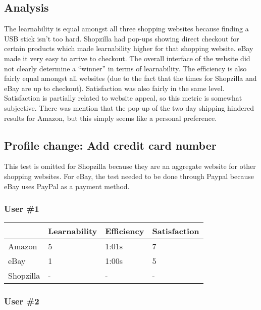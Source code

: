 \documentclass[11pt, oneside]{article}   	%
\begin{document}
\subsection{Analysis}

The learnability is equal amongst all three shopping websites because finding a USB stick isn't too hard. Shopzilla had pop-ups showing direct checkout for certain products which made learnability higher for that shopping website. eBay made it very easy to arrive to checkout. The overall interface of the website did not clearly determine a ``winner'' in terms of learnability. The efficiency is also fairly equal amongst all websites (due to the fact that the times for Shopzilla and eBay are up to checkout). Satisfaction was also fairly in the same level. Satisfaction is partially related to website appeal, so this metric is somewhat subjective. There was mention that the pop-up of the two day shipping hindered results for Amazon, but this simply seems like a personal preference.

\subsection{Profile change: Add credit card number}
    
This test is omitted for Shopzilla because they are an aggregate website for other shopping websites. For eBay, the test needed to be done through Paypal because eBay uses PayPal as a payment method.

\subsubsection{User \#1}

\begin{tabular}{| l | l | l | l |}
    \hline
     & Learnability & Efficiency & Satisfaction \\ \hline
    Amazon & 5 & 1:01s & 7 \\ \hline
    eBay & 1 & 1:00s & 5 \\ \hline
    Shopzilla & - & - & - \\\hline
\end{tabular}

\subsubsection{User \#2}
\end{document}
